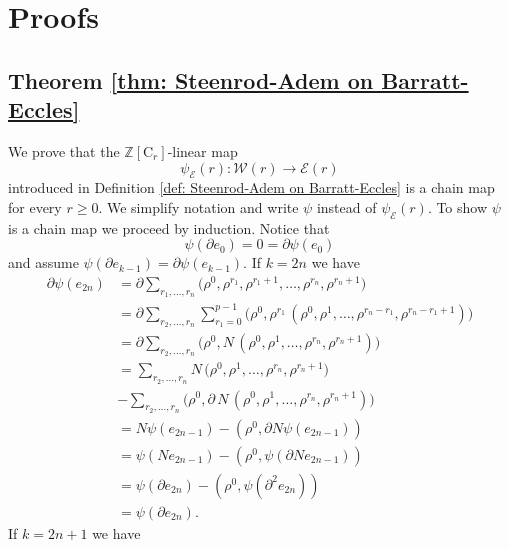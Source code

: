 \documentclass[A4]{amsart}
\theoremstyle{definition}
\newcommand{\Z}{\mathbb{Z}}
\begin{document}
\newpage
\appendix
\section{Proofs}

\subsection{Theorem \ref{thm: Steenrod-Adem on Barratt-Eccles}}

We prove that the $\Z[\mathrm{C}_r]$-linear map
\begin{equation*}
\psi_{\mathcal E}(r) : \mathcal W(r) \to \mathcal E(r)
\end{equation*}
introduced in Definition \ref{def: Steenrod-Adem on Barratt-Eccles} is a chain map for every $r \geq 0$. We simplify notation and write $\psi$ instead of $\psi_{\mathcal E}(r)$. To show $\psi$ is a chain map we proceed by induction. Notice that
\begin{equation*}
\psi(\partial e_0) = 0 = \partial \psi(e_0)
\end{equation*}
and assume $\psi(\partial e_{k-1}) = \partial \psi(e_{k-1})$. If $k = 2n$ we have
\begin{align*}
\partial \psi(e_{2n}) & = 
\partial \sum_{r_1, \dots, r_n} 
\big(\rho^0, \rho^{r_1}, \rho^{r_1+1}, \dots, \rho^{r_n}, \rho^{r_n+1} \big)  \\ & =
\partial \sum_{r_2, \dots, r_n} \sum_{r_1 = 0}^{p-1}
\big(\rho^0, \rho^{r_1} \, (\rho^0, \rho^{1}, \dots, \rho^{r_n-r_1}, \rho^{r_n - r_1 +1}) \big) \\ & =
\partial \sum_{r_2, \dots, r_n}
\big(\rho^0, N\, (\rho^{0}, \rho^{1}, \dots, \rho^{r_n}, \rho^{r_n + 1}) \big) \\ & =
\sum_{r_2, \dots, r_n}
N\, \big( \rho^{0}, \rho^{1}, \dots, \rho^{r_n}, \rho^{r_n + 1} \big) \\ & -
\sum_{r_2, \dots, r_n}
\big(\rho^0, \partial \, N \, (\rho^{0}, \rho^{1}, \dots, \rho^{r_n}, \rho^{r_n+1}) \big) \\ & =
N \psi(e_{2n-1}) - (\rho^0, \partial N \psi (e_{2n-1})) \\ & =
\psi(N e_{2n-1}) - (\rho^0, \psi (\partial N e_{2n-1})) \\ & =
\psi(\partial e_{2n}) - (\rho^0, \psi (\partial^2 e_{2n})) \\ & =
\psi(\partial e_{2n}).
\end{align*}
If $k = 2n+1$ we have
\end{document}
